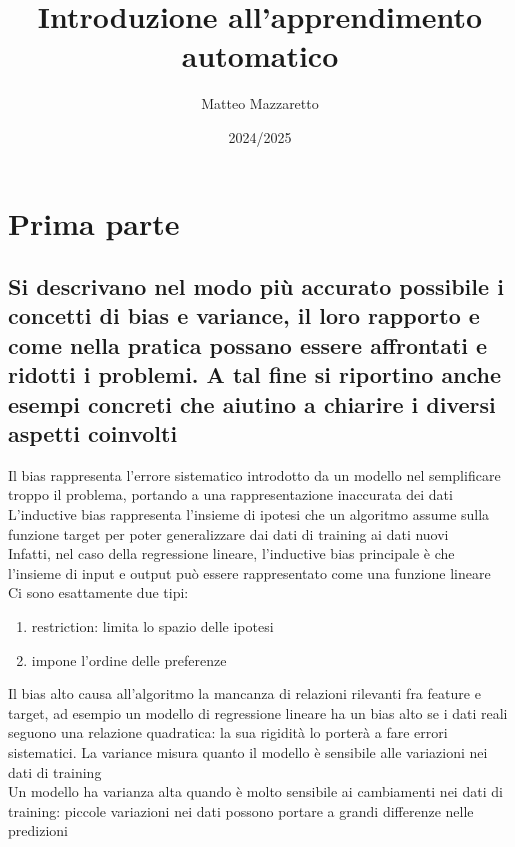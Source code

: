 \documentclass[10pt,oneside,a4paper]{article}
\title{Introduzione all'apprendimento automatico}
\author{Matteo Mazzaretto}
\date{2024/2025}
\begin{document}
\maketitle
\begin{center}
\renewcommand{\contentsname}{Indice}
\tableofcontents
\end{center}
\newpage
\setcounter{page}{1}
\section{Prima parte}
\subsection{Si descrivano nel modo più accurato possibile i concetti di bias e variance, il loro rapporto e come nella pratica possano essere affrontati e ridotti i problemi. A tal fine si riportino anche esempi concreti che aiutino a chiarire i diversi aspetti coinvolti}
Il bias rappresenta l'errore sistematico introdotto da un modello nel semplificare troppo il problema, portando a una rappresentazione inaccurata dei dati\\
L'inductive bias rappresenta l'insieme di ipotesi che un algoritmo assume sulla funzione target per poter generalizzare dai dati di training ai dati nuovi\\
Infatti, nel caso della regressione lineare, l'inductive bias principale è che l'insieme di input e output può essere rappresentato come una funzione lineare\\
Ci sono esattamente due tipi:
\begin{enumerate}
	\item restriction: limita lo spazio delle ipotesi
	\item impone l'ordine delle preferenze
\end{enumerate}
Il bias alto causa all'algoritmo la mancanza di relazioni rilevanti fra feature e target, ad esempio un modello di regressione lineare ha un bias alto se i dati reali seguono una relazione quadratica: la sua rigidità lo porterà a fare errori sistematici.
La variance misura quanto il modello è sensibile alle variazioni nei dati di training\\
Un modello ha varianza alta quando è molto sensibile ai cambiamenti nei dati di training: piccole variazioni nei dati possono portare a grandi differenze nelle predizioni\\
\end{document}
